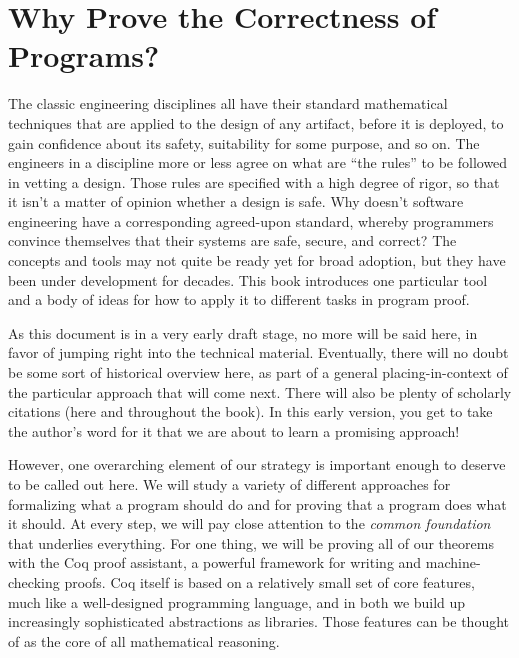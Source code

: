 \documentclass{amsbook}
\theoremstyle{definition}
\theoremstyle{remark}
\numberwithin{section}{chapter}
\numberwithin{equation}{chapter}
\begin{document}
\setcounter{page}{4}

\tableofcontents

\mainmatter


\chapter{Why Prove the Correctness of Programs?}

The classic engineering disciplines all have their standard mathematical techniques that are applied to the design of any artifact, before it is deployed, to gain confidence about its safety, suitability for some purpose, and so on.
The engineers in a discipline more or less agree on what are ``the rules'' to be followed in vetting a design.
Those rules are specified with a high degree of rigor, so that it isn't a matter of opinion whether a design is safe.
Why doesn't software engineering have a corresponding agreed-upon standard, whereby programmers convince themselves that their systems are safe, secure, and correct?
The concepts and tools may not quite be ready yet for broad adoption, but they have been under development for decades.
This book introduces one particular tool and a body of ideas for how to apply it to different tasks in program proof.

As this document is in a very early draft stage, no more will be said here, in favor of jumping right into the technical material.
Eventually, there will no doubt be some sort of historical overview here, as part of a general placing-in-context of the particular approach that will come next.
There will also be plenty of scholarly citations (here and throughout the book).
In this early version, you get to take the author's word for it that we are about to learn a promising approach!

However, one overarching element of our strategy is important enough to deserve to be called out here.
We will study a variety of different approaches for formalizing what a program should do and for proving that a program does what it should.
At every step, we will pay close attention to the \emph{common foundation} that underlies everything.
For one thing, we will be proving all of our theorems with the Coq proof assistant, a powerful framework for writing and machine-checking proofs.
Coq itself is based on a relatively small set of core features, much like a well-designed programming language, and in both we build up increasingly sophisticated abstractions as libraries.
Those features can be thought of as the core of all mathematical reasoning.
\end{document}
